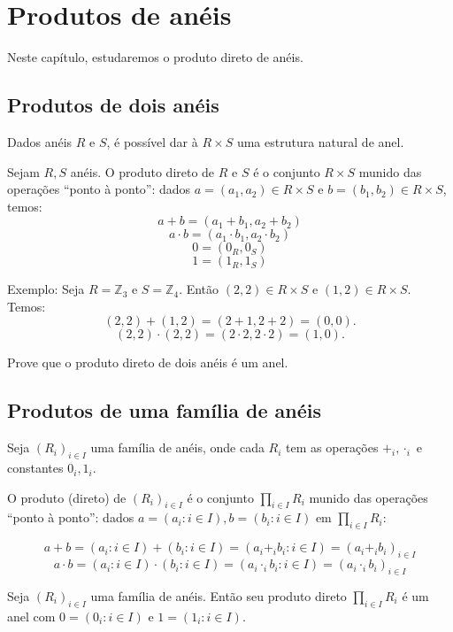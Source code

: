 \chapter{Produtos de anéis}
Neste capítulo, estudaremos o produto direto de anéis.

\section{Produtos de dois anéis}
Dados anéis $R$ e $S$, é possível dar à $R\times S$ uma estrutura natural de anel.
\begin{definition}
    Sejam $R, S$ anéis.
    O produto direto de $R$ e $S$ é o conjunto $R\times S$ munido das operações ``ponto à ponto'': dados $a=(a_1, a_2)\in R\times S$ e $b=(b_1, b_2)\in R\times S$, temos:
    \[a+b=(a_1+b_1, a_2+b_2)\]
    \[a\cdot b=(a_1\cdot b_1, a_2\cdot b_2)\]
    \[0=(0_R, 0_S)\]
    \[1=(1_R, 1_S)\]
\end{definition}

Exemplo: Seja $R=\mathbb Z_3$ e $S=\mathbb Z_4$. Então $(2, 2)\in R\times S$ e $(1, 2)\in R\times S$. Temos:
\[(2, 2)+(1, 2)=(2+ 1, 2+ 2)=(0, 0).\]
\[(2, 2)\cdot (2, 2)=(2\cdot 2, 2\cdot 2)=(1, 0).\]

\begin{exer}
    Prove que o produto direto de dois anéis é um anel.
\end{exer}

\section{Produtos de uma família de anéis}

\begin{definition}
    Seja $(R_i)_{i \in I}$ uma família de anéis, onde cada $R_i$ tem as operações $+_i, \cdot_i$ e constantes $0_i, 1_i$.
    
    O produto (direto) de $(R_i)_{i \in I}$ é o conjunto $\prod_{i \in I} R_i$ munido das operações ``ponto à ponto'': dados $a=(a_i: i \in I), b=(b_i: i \in I)$ em $\prod_{i \in I}R_i$:

    $$a+b=(a_i: i \in I)+(b_i: i \in I)=(a_i+_i b_i: i \in I)=(a_i+_ib_i)_{i \in I}$$
    $$a\cdot b=(a_i: i \in I)\cdot (b_i: i \in I)=(a_i\cdot _i b_i: i \in I)=(a_i\cdot _ib_i)_{i \in I}$$

\end{definition}

\begin{lemma}
    Seja $(R_i)_{i \in I}$ uma família de anéis.
    Então seu produto direto $\prod_{i \in I}R_i$ é um anel com $0=(0_i: i \in I)$ e $1=(1_i: i \in I)$.
\end{lemma}

